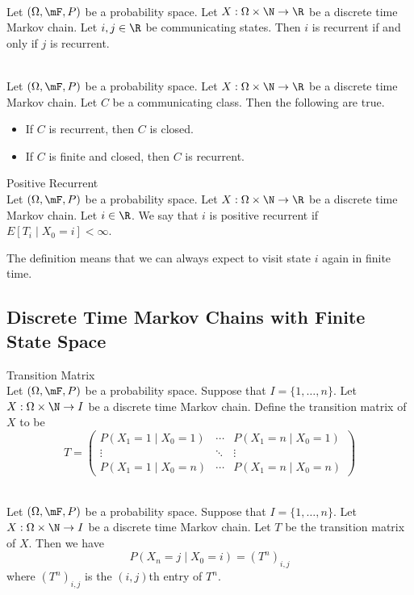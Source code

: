 \documentclass[a4paper]{article}
\begin{document}
\begin{prp}{}{}\\
Let $(\Omega,\mF,P)$ be a probability space. Let $X:\Omega\times\N\to\R$ be a discrete time Markov chain. Let $i,j\in\R$ be communicating states. Then $i$ is recurrent if and only if $j$ is recurrent. 
\end{prp}

\begin{prp}{}{}\\
Let $(\Omega,\mF,P)$ be a probability space. Let $X:\Omega\times\N\to\R$ be a discrete time Markov chain. Let $C$ be a communicating class. Then the following are true. 
\begin{itemize}
\item If $C$ is recurrent, then $C$ is closed. 
\item If $C$ is finite and closed, then $C$ is recurrent. 
\end{itemize}
\end{prp}

\begin{defn}{Positive Recurrent}{}\\
Let $(\Omega,\mF,P)$ be a probability space. Let $X:\Omega\times\N\to\R$ be a discrete time Markov chain. Let $i\in\R$. We say that $i$ is positive recurrent if $E[T_i\;|\;X_0=i]<\infty$. 
\end{defn}

The definition means that we can always expect to visit state $i$ again in finite time. 

\subsection{Discrete Time Markov Chains with Finite State Space}
\begin{defn}{Transition Matrix}{}\\
Let $(\Omega,\mF,P)$ be a probability space. Suppose that $I=\{1,\dots,n\}$. Let $X:\Omega\times\N\to I$ be a discrete time Markov chain. Define the transition matrix of $X$ to be $$T=\begin{pmatrix}
P(X_1=1\;|\;X_0=1) & \cdots & P(X_1=n\;|\;X_0=1)\\
\vdots & \ddots & \vdots\\
P(X_1=1\;|\;X_0=n) & \cdots & P(X_1=n\;|\;X_0=n)
\end{pmatrix}$$
\end{defn}

\begin{prp}{}{}\\
Let $(\Omega,\mF,P)$ be a probability space. Suppose that $I=\{1,\dots,n\}$. Let $X:\Omega\times\N\to I$ be a discrete time Markov chain. Let $T$ be the transition matrix of $X$. Then we have $$P(X_n=j\;|\;X_0=i)=(T^n)_{i,j}$$ where $(T^n)_{i,j}$ is the $(i,j)$th entry of $T^n$. 
\end{prp}
\end{document}
